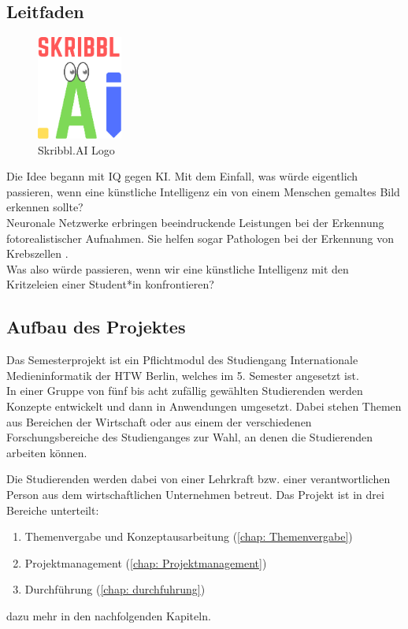 \documentclass[11pt]{article}
\begin{document}
\subsection{Leitfaden}
\label{chap: leitfaden}
\begin{figure}
\centering
\includegraphics[width=0.25\textwidth]{images/logo_skribbl.png}
\caption{\label{fig:skribblLogo}Skribbl.AI Logo}
\end{figure}
Die Idee begann mit IQ gegen KI. Mit dem Einfall, was würde eigentlich passieren, wenn eine künstliche Intelligenz ein von einem Menschen gemaltes Bild  erkennen sollte? \\
Neuronale Netzwerke erbringen beeindruckende Leistungen bei der Erkennung fotorealistischer Aufnahmen. Sie helfen sogar Pathologen bei der Erkennung von Krebszellen \parencite{ElizabethDougherty2018}.\\
Was also würde  passieren, wenn wir eine künstliche Intelligenz mit den Kritzeleien einer Student*in konfrontieren?
 
\subsection{Aufbau des Projektes}
\label{chap: Aufbau}

Das Semesterprojekt ist ein Pflichtmodul des Studiengang Internationale Medieninformatik der HTW Berlin, welches im 5. Semester angesetzt ist. \\
In einer Gruppe von fünf bis acht zufällig gewählten Studierenden werden Konzepte entwickelt und dann in Anwendungen umgesetzt. Dabei stehen Themen aus Bereichen der Wirtschaft oder aus einem der verschiedenen Forschungsbereiche des Studienganges zur Wahl, an denen die Studierenden arbeiten können.

Die Studierenden werden dabei von einer Lehrkraft bzw. einer verantwortlichen Person aus dem wirtschaftlichen Unternehmen betreut.
Das Projekt ist in drei Bereiche unterteilt: 
\begin{enumerate}
	\item Themenvergabe und Konzeptausarbeitung (\autoref{chap: Themenvergabe})
	\item Projektmanagement (\autoref{chap: Projektmanagement})
	\item Durchführung (\autoref{chap: durchfuhrung})
\end{enumerate}
dazu mehr in den nachfolgenden Kapiteln.
\end{document}
